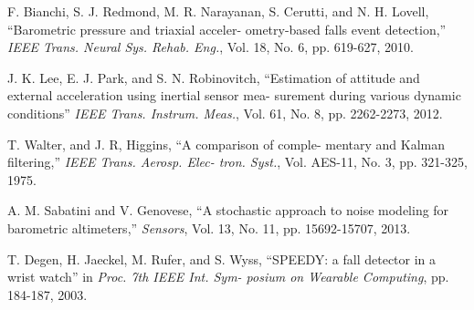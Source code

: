 \documentclass[10pt,journal,compsoc]{IEEEtran}
\begin{document}
\begin{thebibliography}{1}
        F. Bianchi, S. J. Redmond, M. R. Narayanan, S. Cerutti, and
        N. H. Lovell, ``Barometric pressure and triaxial acceler-
        ometry-based falls event detection,'' \emph{IEEE Trans. Neural
        Sys. Rehab. Eng.}, Vol. 18, No. 6, pp. 619-627, 2010.

         J. K. Lee, E. J. Park, and S. N. Robinovitch, ``Estimation of
        attitude and external acceleration using inertial sensor mea-
        surement during various dynamic conditions'' \emph{IEEE Trans.
        Instrum. Meas.}, Vol. 61, No. 8, pp. 2262-2273, 2012.

         T. Walter, and J. R, Higgins, ``A comparison of comple-
        mentary and Kalman filtering,'' \emph{IEEE Trans. Aerosp. Elec-
        tron. Syst.}, Vol. AES-11, No. 3, pp. 321-325, 1975.

         A. M. Sabatini and V. Genovese, ``A stochastic approach to
        noise modeling for barometric altimeters,'' \emph{Sensors}, Vol. 13,
        No. 11, pp. 15692-15707, 2013.

         T. Degen, H. Jaeckel, M. Rufer, and S. Wyss, ``SPEEDY: a
        fall detector in a wrist watch'' in \emph{Proc. 7th IEEE Int. Sym-
        posium on Wearable Computing}, pp. 184-187, 2003.

    \end{thebibliography}
\end{document}
